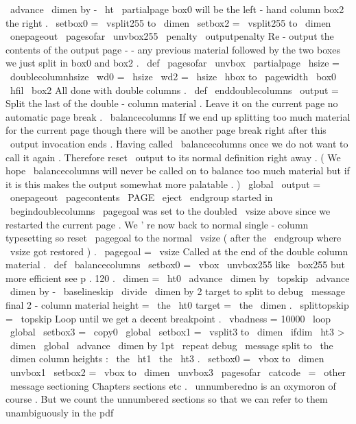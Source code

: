 {{{\
advance
\
dimen
by
-
\
ht
\
partialpage
%
%
box0
will
be
the
left
-
hand
column
box2
the
right
.
\
setbox0
=
\
vsplit255
to
\
dimen
\
setbox2
=
\
vsplit255
to
\
dimen
\
onepageout
\
pagesofar
\
unvbox255
\
penalty
\
outputpenalty
}
%
%
Re
-
output
the
contents
of
the
output
page
-
-
any
previous
material
%
followed
by
the
two
boxes
we
just
split
in
box0
and
box2
.
\
def
\
pagesofar
{
%
\
unvbox
\
partialpage
%
\
hsize
=
\
doublecolumnhsize
\
wd0
=
\
hsize
\
wd2
=
\
hsize
\
hbox
to
\
pagewidth
{
\
box0
\
hfil
\
box2
}
%
}
%
%
All
done
with
double
columns
.
\
def
\
enddoublecolumns
{
%
\
output
=
{
%
%
Split
the
last
of
the
double
-
column
material
.
Leave
it
on
the
%
current
page
no
automatic
page
break
.
\
balancecolumns
%
%
If
we
end
up
splitting
too
much
material
for
the
current
page
%
though
there
will
be
another
page
break
right
after
this
\
output
%
invocation
ends
.
Having
called
\
balancecolumns
once
we
do
not
%
want
to
call
it
again
.
Therefore
reset
\
output
to
its
normal
%
definition
right
away
.
(
We
hope
\
balancecolumns
will
never
be
%
called
on
to
balance
too
much
material
but
if
it
is
this
makes
%
the
output
somewhat
more
palatable
.
)
\
global
\
output
=
{
\
onepageout
{
\
pagecontents
\
PAGE
}
}
%
}
%
\
eject
\
endgroup
%
started
in
\
begindoublecolumns
%
%
\
pagegoal
was
set
to
the
doubled
\
vsize
above
since
we
restarted
%
the
current
page
.
We
'
re
now
back
to
normal
single
-
column
%
typesetting
so
reset
\
pagegoal
to
the
normal
\
vsize
(
after
the
%
\
endgroup
where
\
vsize
got
restored
)
.
\
pagegoal
=
\
vsize
}
%
%
Called
at
the
end
of
the
double
column
material
.
\
def
\
balancecolumns
{
%
\
setbox0
=
\
vbox
{
\
unvbox255
}
%
like
\
box255
but
more
efficient
see
p
.
120
.
\
dimen
=
\
ht0
\
advance
\
dimen
by
\
topskip
\
advance
\
dimen
by
-
\
baselineskip
\
divide
\
dimen
by
2
%
target
to
split
to
%
debug
\
message
{
final
2
-
column
material
height
=
\
the
\
ht0
target
=
\
the
\
dimen
.
}
%
\
splittopskip
=
\
topskip
%
Loop
until
we
get
a
decent
breakpoint
.
{
%
\
vbadness
=
10000
\
loop
\
global
\
setbox3
=
\
copy0
\
global
\
setbox1
=
\
vsplit3
to
\
dimen
\
ifdim
\
ht3
>
\
dimen
\
global
\
advance
\
dimen
by
1pt
\
repeat
}
%
%
debug
\
message
{
split
to
\
the
\
dimen
column
heights
:
\
the
\
ht1
\
the
\
ht3
.
}
%
\
setbox0
=
\
vbox
to
\
dimen
{
\
unvbox1
}
%
\
setbox2
=
\
vbox
to
\
dimen
{
\
unvbox3
}
%
%
\
pagesofar
}
\
catcode
\
=
\
other
\
message
{
sectioning
}
%
Chapters
sections
etc
.
%
\
unnumberedno
is
an
oxymoron
of
course
.
But
we
count
the
unnumbered
%
sections
so
that
we
can
refer
to
them
unambiguously
in
the
pdf
}}
